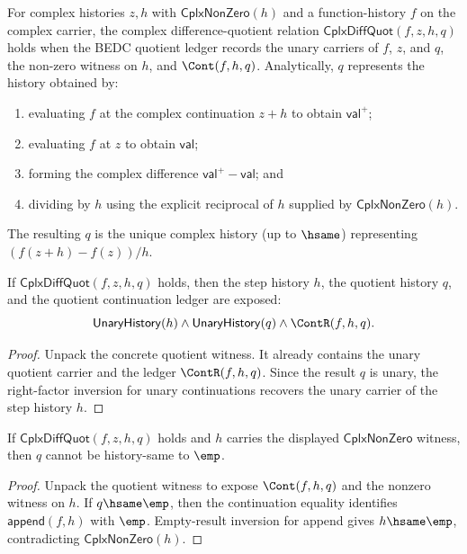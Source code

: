 \begin{definition}
\label{def:cplx-diff-quot}
For complex histories \(z, h\) with \(\mathsf{CplxNonZero}(h)\) and a function-history \(f\) on the complex carrier, the complex difference-quotient relation \(\mathsf{CplxDiffQuot}(f, z, h, q)\) holds when the BEDC quotient ledger records the unary carriers of \(f\), \(z\), and \(q\), the non-zero witness on \(h\), and \(\Cont(f,h,q)\). Analytically, \(q\) represents the history obtained by:
\begin{enumerate}
  \item evaluating \(f\) at the complex continuation \(z + h\) to obtain \(\mathsf{val}^+\);
  \item evaluating \(f\) at \(z\) to obtain \(\mathsf{val}\);
  \item forming the complex difference \(\mathsf{val}^+ - \mathsf{val}\); and
  \item dividing by \(h\) using the explicit reciprocal of \(h\) supplied by \(\mathsf{CplxNonZero}(h)\).
\end{enumerate}
The resulting \(q\) is the unique complex history (up to \(\hsame\)) representing \((f(z+h)-f(z))/h\).
\end{definition}

\begin{theorem}
\label{thm:cplx-diff-quot-step-unary}
If $\mathsf{CplxDiffQuot}(f,z,h,q)$ holds, then the step history $h$, the
quotient history $q$, and the quotient continuation ledger are exposed:
$$
\mathsf{UnaryHistory}(h)\land
\mathsf{UnaryHistory}(q)\land
\ContR(f,h,q).
$$
\end{theorem}
\begin{proof}
Unpack the concrete quotient witness. It already contains the unary quotient
carrier and the ledger $\ContR(f,h,q)$. Since the result $q$ is unary, the
right-factor inversion for unary continuations recovers the unary carrier of
the step history $h$.
\end{proof}

\begin{lemma}
\label{thm:cplx-diff-quot-result-nonempty-from-step}
If $\mathsf{CplxDiffQuot}(f,z,h,q)$ holds and $h$ carries the displayed
$\mathsf{CplxNonZero}$ witness, then $q$ cannot be history-same to $\emp$.
\end{lemma}
\begin{proof}
Unpack the quotient witness to expose $\Cont(f,h,q)$ and the nonzero witness
on $h$. If $q\hsame\emp$, then the continuation equality identifies
$\mathsf{append}(f,h)$ with $\emp$. Empty-result inversion for append gives
$h\hsame\emp$, contradicting $\mathsf{CplxNonZero}(h)$.
\end{proof}

